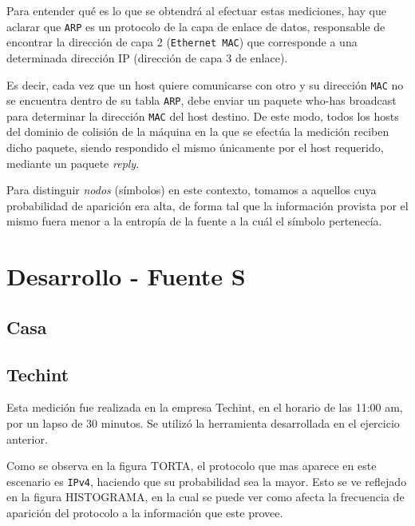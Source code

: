 \documentclass[final,narroweqnarray,inline]{ieee}
\begin{document}
\medskip

Para entender qué es lo que se obtendrá al efectuar estas mediciones,
hay que aclarar que \texttt{ARP} es un protocolo de la capa de enlace
de datos, responsable de encontrar la dirección de capa 2
(\texttt{Ethernet MAC}) que corresponde a una determinada dirección IP
(dirección de capa 3 de enlace).

Es decir, cada vez que un host quiere comunicarse con otro y su
dirección \texttt{MAC} no se encuentra dentro de su tabla
\texttt{ARP}, debe enviar un paquete who-has broadcast para determinar
la dirección \texttt{MAC} del host destino. De este modo, todos los
hosts del dominio de colisión de la máquina en la que se efectúa la
medición reciben dicho paquete, siendo respondido el mismo únicamente
por el host requerido, mediante un paquete \emph{reply}.

Para distinguir \emph{nodos} (símbolos) en este contexto, tomamos a
aquellos cuya probabilidad de aparición era alta, de forma tal que la
información provista por el mismo fuera menor a la entropía de la
fuente a la cuál el símbolo pertenecía.

\newpage
\section{Desarrollo - Fuente S}
  \subsection{Casa}

  \subsection{Techint}
  Esta medición fue realizada en la empresa Techint, en el horario de las
  11:00 am, por un lapso de 30 minutos. Se utilizó la herramienta
  desarrollada en el ejercicio anterior. 

  
  Como se observa en la figura TORTA, el protocolo que mas aparece en
  este escenario es \texttt{IPv4}, haciendo que su probabilidad sea la
  mayor. Esto se ve reflejado en la figura HISTOGRAMA, en la cual se puede
  ver como afecta la frecuencia de aparición del protocolo a la información
  que este provee.
\end{document}
